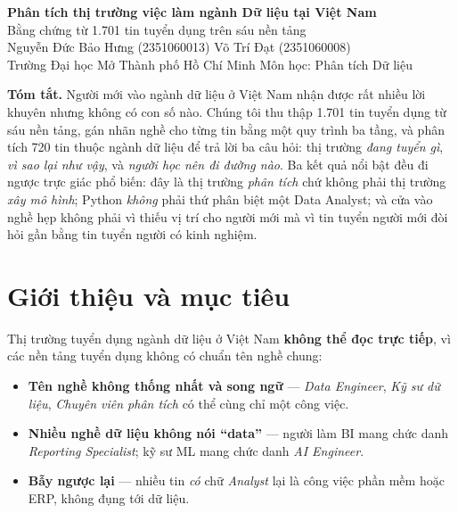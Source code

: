\documentclass[10pt]{article}
\begin{document}
\begin{center}
{\LARGE\bfseries Phân tích thị trường việc làm ngành Dữ liệu tại Việt Nam}\\[4pt]
{\normalsize Bằng chứng từ 1.701 tin tuyển dụng trên sáu nền tảng}\\[12pt]

{\large Nguyễn Đức Bảo Hưng \textnormal{(2351060013)} \qquad Võ Trí Đạt \textnormal{(2351060008)}}\\[5pt]
{\normalsize Trường Đại học Mở Thành phố Hồ Chí Minh \quad\textbar\quad Môn học: Phân tích Dữ liệu}
\end{center}

\vspace{4pt}
\begin{center}
\begin{minipage}{0.93\textwidth}
{\bfseries Tóm tắt.}\; Người mới vào ngành dữ liệu ở Việt Nam nhận được rất nhiều lời khuyên nhưng
không có con số nào. Chúng tôi thu thập 1.701 tin tuyển dụng từ sáu nền tảng, gán nhãn nghề cho từng
tin bằng một quy trình ba tầng, và phân tích 720 tin thuộc ngành dữ liệu để trả lời ba câu hỏi:
thị trường \emph{đang tuyển gì}, \emph{vì sao lại như vậy}, và \emph{người học nên đi đường nào}.
Ba kết quả nổi bật đều đi ngược trực giác phổ biến: đây là thị trường \emph{phân tích} chứ không phải
thị trường \emph{xây mô hình}; Python \emph{không} phải thứ phân biệt một Data Analyst; và cửa vào
nghề hẹp không phải vì thiếu vị trí cho người mới mà vì tin tuyển người mới đòi hỏi gần bằng tin
tuyển người có kinh nghiệm.
\end{minipage}
\end{center}
\vspace{6pt}

\section{Giới thiệu và mục tiêu}

Thị trường tuyển dụng ngành dữ liệu ở Việt Nam \textbf{không thể đọc trực tiếp}, vì các nền tảng
tuyển dụng không có chuẩn tên nghề chung:

\begin{itemize}
\item \textbf{Tên nghề không thống nhất và song ngữ} --- \textit{Data Engineer}, \textit{Kỹ sư dữ liệu},
      \textit{Chuyên viên phân tích} có thể cùng chỉ một công việc.
\item \textbf{Nhiều nghề dữ liệu không nói ``data''} --- người làm BI mang chức danh
      \textit{Reporting Specialist}; kỹ sư ML mang chức danh \textit{AI Engineer}.
\item \textbf{Bẫy ngược lại} --- nhiều tin \emph{có} chữ \textit{Analyst} lại là công việc phần mềm hoặc
      ERP, không đụng tới dữ liệu.
\end{itemize}
\end{document}
